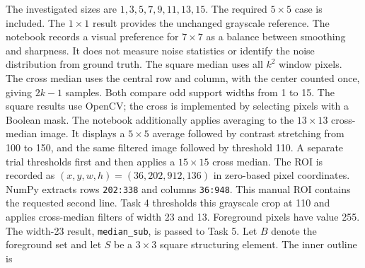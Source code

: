 The investigated sizes are $1,3,5,7,9,11,13,15$. The required $5\times5$ case is included. The $1\times1$ result provides the unchanged grayscale reference.
The notebook records a visual preference for $7\times7$ as a balance between smoothing and sharpness. It does not measure noise statistics or identify the noise distribution from ground truth.
The square median uses all $k^2$ window pixels. The cross median uses the central row and column, with the center counted once, giving $2k-1$ samples. Both compare odd support widths from 1 to 15. The square results use OpenCV; the cross is implemented by selecting pixels with a Boolean mask.
The notebook additionally applies averaging to the $13\times13$ cross-median image. It displays a $5\times5$ average followed by contrast stretching from 100 to 150, and the same filtered image followed by threshold 110. A separate trial thresholds first and then applies a $15\times15$ cross median.
The ROI is recorded as $(x,y,w,h)=(36,202,912,136)$ in zero-based pixel coordinates. NumPy extracts rows \texttt{202:338} and columns \texttt{36:948}. This manual ROI contains the requested second line.
Task 4 thresholds this grayscale crop at 110 and applies cross-median filters of width 23 and 13. Foreground pixels have value 255. The width-23 result, \texttt{median\_sub}, is passed to Task 5.
Let $B$ denote the foreground set and let $S$ be a $3\times3$ square structuring element. The inner outline is

